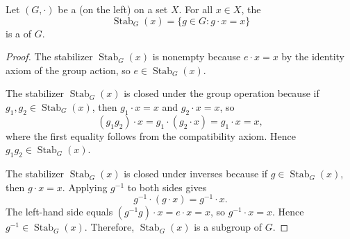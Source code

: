 \begin{proposition} \label{proposition:stabilizer_of_element_under_group_action_is_subgroup}
    Let $(G,\cdot)$ be a   (on the left) on a set $X$.
    For all $x \in X$, the 
    $$\operatorname{Stab}_G(x) = \{ g \in G : g \cdot x = x \}$$
    is a  of $G$.
\end{proposition}
\begin{proof}
        The stabilizer $\operatorname{Stab}_G(x)$ is nonempty because $e \cdot x = x$ by the identity axiom of the group action, so $e \in \operatorname{Stab}_G(x)$.

        The stabilizer $\operatorname{Stab}_G(x)$ is closed under the group operation because if $g_1, g_2 \in \operatorname{Stab}_G(x)$, then $g_1 \cdot x = x$ and $g_2 \cdot x = x$, so
        $$(g_1 g_2) \cdot x = g_1 \cdot (g_2 \cdot x) = g_1 \cdot x = x,$$
        where the first equality follows from the compatibility axiom. Hence $g_1 g_2 \in \operatorname{Stab}_G(x)$.

        The stabilizer $\operatorname{Stab}_G(x)$ is closed under inverses because if $g \in \operatorname{Stab}_G(x)$, then $g \cdot x = x$. Applying $g^{-1}$ to both sides gives
        $$g^{-1} \cdot (g \cdot x) = g^{-1} \cdot x.$$
        The left-hand side equals $(g^{-1}g) \cdot x = e \cdot x = x$, so $g^{-1} \cdot x = x$. Hence $g^{-1} \in \operatorname{Stab}_G(x)$.
    Therefore, $\operatorname{Stab}_G(x)$ is a subgroup of $G$.
\end{proof}
